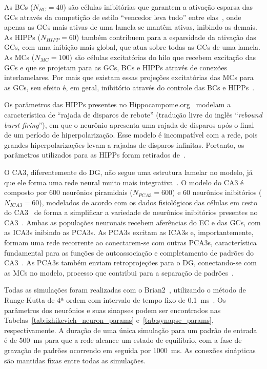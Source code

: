As BCs ($N_{BC} = 40$) são células inibitórias que garantem a ativação esparsa das GCs através da competição de estilo ``vencedor
leva tudo'' entre elas~\cite{coultripCortical1992,chavlisDendrites2017,kimAdult2024}, onde apenas as GCs mais ativas de uma lamela
se mantêm ativas, inibindo as demais. As HIPPs ($N_{HIPP} = 60$) também contribuem para a esparsidade da ativação das GCs, com uma
inibição mais global, que atua sobre todas as GCs de uma lamela. As MCs ($N_{MC} = 100$) são células excitatórias do hilo que
recebem excitação das GCs e que se projetam para as GCs, BCs e HIPPs através de conexões interlamelares. Por mais que existam
essas projeções excitatórias das MCs para as GCs, seu efeito é, em geral, inibitório através do controle das BCs e
HIPPs~\cite{myersRole2009,scharfmanHilar2013}.

Os parâmetros das HIPPs presentes no Hippocampome.org~\cite{wheelerHippocampomeorg2023} modelam a característica de ``rajada de
disparos de rebote'' (tradução livre do inglês ``\textit{rebound burst firing}''), em que o neurônio apresenta uma rajada de
disparos após o final de um período de hiperpolarização. Esse modelo é incompatível com a rede, pois grandes hiperpolarizações
levam a rajadas de disparos infinitas. Portanto, os parâmetros utilizados para as HIPPs foram retirados
de~.

O CA3, diferentemente do DG, não segue uma estrutura lamelar no modelo, já que ele forma uma rede neural muito mais
integrativa~\cite{pakHippocampal2022, watsonHuman2025}. O modelo do CA3 é composto por 600 neurônios piramidais ($N_{PCA3} = 600$)
e 60 neurônios inibitórios ($N_{ICA3} = 60$), modelados de acordo com os dados fisiológicos das células em cesto do
CA3~\cite{wheelerHippocampomeorg2023} de forma a simplificar a variedade de neurônios inibitórios presentes no
CA3~\cite{kopsickFormation2024}. Ambas as populações neuronais recebem aferências do EC e das GCs, com as ICA3s inibindo as PCA3s.
As PCA3s excitam as ICA3s e, importantemente, formam uma rede recorrente ao conectarem-se com outras PCA3s, característica
fundamental para as funções de autoassociação e completamento de padrões do CA3~\cite{kopsickFormation2024, rollsMechanisms2013}.
As PCA3s também enviam retroprojeções para o DG, conectando-se com as MCs no modelo, processo que contribui para a separação de
padrões~\cite{myersPattern2011}.

Todas as simulações foram realizadas com o Brian2~\cite{stimbergBrian2019a}, utilizando o método de Runge-Kutta de 4ª ordem com
intervalo de tempo fixo de \SI{0.1}{\milli\second}~\cite{butcherHistory1996}. Os parâmetros dos neurônios e suas sinapses podem
ser encontrados nas Tabelas~\ref{tab:izhikevich_neuron_params} e~\ref{tab:synapse_params}, respectivamente. A duração de uma única
simulação para um padrão de entrada é de \SI{500}{\milli\second} para que a rede alcance um estado de equilíbrio, com a fase de
gravação de padrões ocorrendo em seguida por \SI{1000}{\milli\second}. As conexões sinápticas são mantidas fixas entre todas as
simulações.

